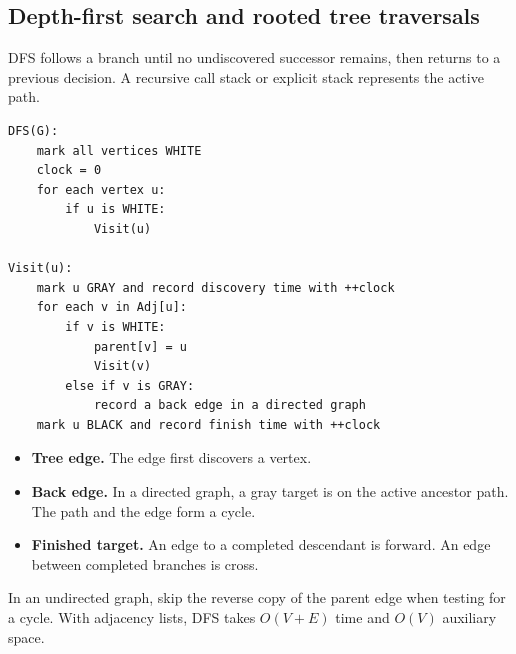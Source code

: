 \documentclass[12pt,a4paper]{article}
\begin{document}
\subsection{Depth-first search and rooted tree traversals}
\begin{tcolorbox}[defbox, title={Depth-first search (DFS)}]
DFS follows a branch until no undiscovered successor remains, then returns to a previous decision. A recursive call stack or explicit stack represents the active path.
\end{tcolorbox}

\begin{tcolorbox}[formulabox, title={DFS with discovery and finishing times}]
\begin{verbatim}
DFS(G):
    mark all vertices WHITE
    clock = 0
    for each vertex u:
        if u is WHITE:
            Visit(u)

Visit(u):
    mark u GRAY and record discovery time with ++clock
    for each v in Adj[u]:
        if v is WHITE:
            parent[v] = u
            Visit(v)
        else if v is GRAY:
            record a back edge in a directed graph
    mark u BLACK and record finish time with ++clock
\end{verbatim}
\end{tcolorbox}

\begin{itemize}[leftmargin=*, itemsep=2pt]
  \item \textbf{Tree edge.} The edge first discovers a vertex.
  \item \textbf{Back edge.} In a directed graph, a gray target is on the active ancestor path. The path and the edge form a cycle.
  \item \textbf{Finished target.} An edge to a completed descendant is forward. An edge between completed branches is cross.
\end{itemize}
In an undirected graph, skip the reverse copy of the parent edge when testing for a cycle. With adjacency lists, DFS takes $O(V+E)$ time and $O(V)$ auxiliary space.
\begin{tcolorbox}[tikzbox, title={Directed graph for the traversal and ordering traces}]
\centering
{}\par
\end{tcolorbox}
\end{document}
